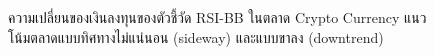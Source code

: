 \begin{figure}[!ht]
    \centering
    \caption{ความเปลี่ยนของเงินลงทุนของตัวชี้วัด RSI-BB ในตลาด Crypto Currency แนวโน้มตลาดแบบทิศทางไม่แน่นอน (sideway) และแบบขาลง (downtrend)}
\end{figure}